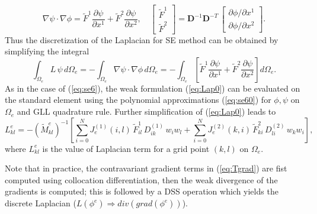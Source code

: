 \documentclass{agujournal}
\begin{document}
{ \begin{equation}
    \nabla \psi \cdot \nabla \phi  = \tilde{F}^1  \frac{\partial \psi}{ \partial x^1} +
      \tilde{F}^2  \frac{\partial \psi}{ \partial x^2} , \quad 
     \left[   \begin{array}{c}
               \tilde{F}^1  \\     \tilde{F}^2
             \end{array}
           \right]
           =
     \mathbf{D}^{-1}  \mathbf{D}^{-T}   \, \left[   \begin{array}{c}
                \partial \phi / \partial x^1  \\ \partial \phi / \partial x^2 
             \end{array}
           \right] 
           \label{eq:Tgrad}.
  \end{equation}
Thus the discretization of the Laplacian for SE method can be obtained by simplifying the integral 
%
 \begin{equation}
   \int_{\Omega_e}  L \, \psi  \,  d \Omega_e  = -   \int_{\Omega_e}  \nabla \psi \cdot \nabla \phi \,  d \Omega_e
    = -  \int_{\Omega_e} \left[  \tilde{F}^1  \frac{\partial \psi}{ \partial x^1} +
      \tilde{F}^2  \frac{\partial \psi}{ \partial x^2}  \right]    d \Omega_e.  \label{eq:Lap0}
  \end{equation}
 As in the case of  (\ref{eq:se6}),  the weak formulation (\ref{eq:Lap0})  can be evaluated  on the standard element   
  using    the polynomial approximations (\ref{eq:se60}) for $\phi, \psi$ on $\Omega_e$ and GLL quadrature rule.
   Further simplification of (\ref{eq:Lap0})  leads to 
   \begin{equation}
     L^e_{kl} =  - ( \widetilde M^e_{kl})^{-1} \left[ 
           \sum_{i=0}^N  J^{(1)}_e(i,l) \,  \tilde{F}^1_{i l} \, D_{ik}^{(1)}\, w_i  w_l  +
           \sum_{i=0}^N  J^{(2)}_e(k, i) \,  \tilde{F}^2_{k i} \, D_{l i}^{(2)} \, w_k  w_i  \right], 
           \label{eq:Lap1}
   \end{equation}
 where $L^e_{kl}$ is the value of Laplacian term for a grid point $(k,l)$ on $\Omega_e$.  
 
 
   Note that in practice,
 the contravariant gradient terms in  (\ref{eq:Tgrad}) are fist  computed using collocation differentiation,   
 then  the weak  divergence of the gradients   is computed;    this is followed by a  DSS operation which 
 yields the discrete Laplacian ($ L(\phi^e)  \Rightarrow  div(grad(\phi^e))$). 
 
}
\end{document}

